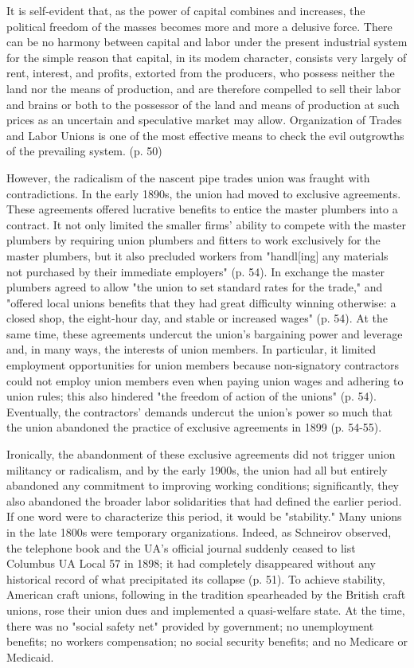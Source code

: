 \documentclass[12pt]{article}
\renewenvironment{quote}
  {\list{}{\leftmargin=\parindent\rightmargin=0pt}%
   \item\relax}
  {\endlist}
\begin{document}
\begin{quote}
It is self-evident that, as the power of capital combines and increases, the political freedom of the masses becomes more and more a delusive force. There can be no harmony between capital and labor under the present industrial system for the simple reason that capital, in its modem character, consists very largely of rent, interest, and profits, extorted from the producers, who possess neither the land nor the means of production, and are therefore compelled to sell their labor and brains or both to the possessor of the land and means of production at such prices as an uncertain and speculative market may allow. Organization of Trades and Labor Unions is one of the most effective means to check the evil outgrowths of the prevailing system. (p. 50)
\end{quote}

However, the radicalism of the nascent pipe trades union was fraught with contradictions. In the early 1890s, the union had moved to exclusive agreements. These agreements offered lucrative benefits to entice the master plumbers into a contract. It not only limited the smaller firms’ ability to compete with the master plumbers by requiring union plumbers and fitters to work exclusively for the master plumbers, but it also precluded workers from "handl[ing] any materials not purchased by their immediate employers" (p. 54). In exchange the master plumbers agreed to allow "the union to set standard rates for the trade," and "offered local unions benefits that they had great difficulty winning otherwise: a closed shop, the eight-hour day, and stable or increased wages" (p. 54). At the same time, these agreements undercut the union’s bargaining power and leverage and, in many ways, the interests of union members. In particular, it limited employment opportunities for union members because non-signatory contractors could not employ union members even when paying union wages and adhering to union rules; this also hindered "the freedom of action of the unions" (p. 54). Eventually, the contractors’ demands undercut the union’s power so much that the union abandoned the practice of exclusive agreements in 1899 (p. 54-55).

Ironically, the abandonment of these exclusive agreements did not trigger union militancy or radicalism, and by the early 1900s, the union had all but entirely abandoned any commitment to improving working conditions; significantly, they also abandoned the broader labor solidarities that had defined the earlier period. If one word were to characterize this period, it would be "stability." Many unions in the late 1800s were temporary organizations. Indeed, as Schneirov observed, the telephone book and the UA’s official journal suddenly ceased to list Columbus UA Local 57 in 1898; it had completely disappeared without any historical record of what precipitated its collapse (p. 51). To achieve stability, American craft unions, following in the tradition spearheaded by the British craft unions, rose their union dues and implemented a quasi-welfare state. At the time, there was no "social safety net" provided by government; no unemployment benefits; no workers compensation; no social security benefits; and no Medicare or Medicaid. 
\end{document}
